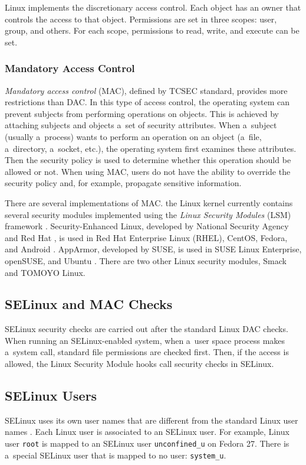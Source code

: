 Linux implements the discretionary access control. Each object has an owner
that controls the access to that object. Permissions are set in three scopes:
user, group, and others. For each scope, permissions to read, write, and execute
can be set.

\subsubsection{Mandatory Access Control}
\emph{Mandatory access control} (MAC), defined by TCSEC standard, provides more
restrictions than DAC. In this type of access control, the operating system can
prevent subjects from performing operations on objects. This is achieved by
attaching subjects and objects a~set of security attributes. When a~subject
(usually a~process) wants to perform an operation on an object (a~file,
a~directory, a~socket, etc.), the operating system first examines these
attributes. Then the security policy is used to determine whether this operation
should be allowed or not. When using MAC, users do not have the ability to
override the security policy and, for example, propagate sensitive information.

There are several implementations of MAC. the Linux kernel currently contains
several security modules implemented using the \emph{Linux Security Modules}
(LSM) framework \cite{lsmusage}. Security-Enhanced Linux, developed by National
Security Agency and Red Hat \cite{selinuxcontr}, is used in Red Hat Enterprise
Linux (RHEL), CentOS, Fedora, and Android
\cite{selinuxguide,selinuxguidefedora,selinuxandroid}. AppArmor, developed by
SUSE, is used in SUSE Linux Enterprise, openSUSE, and Ubuntu
\cite{apparmor,apparmorubuntu}. There are two other Linux security modules,
Smack and TOMOYO Linux.

\subsection{SELinux and MAC Checks}
SELinux security checks are carried out after the standard Linux DAC checks.
When running an SELinux-enabled system, when a~user space process makes a~system
call, standard file permissions are checked first. Then, if the access is
allowed, the Linux Security Module hooks call security checks in SELinux.

\subsection{SELinux Users}
\label{selinuxuser}
SELinux uses its own user names that are different from the standard Linux user
names \cite[p.~24]{tsn}. Each Linux user is associated to an SELinux user. For
example, Linux user \texttt{root} is mapped to an SELinux user
\texttt{unconfined\_u} on Fedora 27. There is a~special SELinux user that is
mapped to no user: \texttt{system\_u}.

